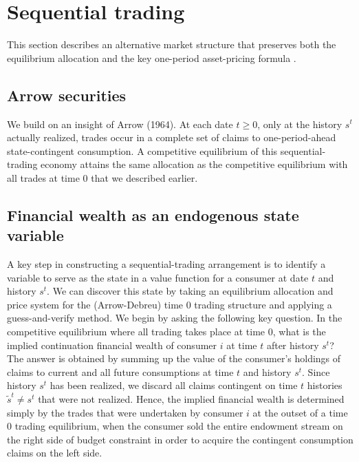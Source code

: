 
\section{Sequential trading}\label{sec:arrowsecurities}%
This section describes an alternative
market structure that preserves both the  equilibrium  allocation
 and the  key one-period asset-pricing formula
.



\subsection{Arrow securities}
We build on an insight of Arrow (1964).
At
each date  $t \geq 0$,  only at the history $s^t$ actually realized,  trades occur in a complete set of claims   to
one-period-ahead state-contingent consumption. A
competitive equilibrium of this sequential-trading economy
  attains the same allocation
as the competitive  equilibrium with all trades at time $0$ that we described earlier.



\subsection{Financial wealth as an endogenous state variable}
A key step in constructing a sequential-trading arrangement is to
identify a variable to serve as the state in a value function for
a consumer at date $t$ and history $s^t$. We can discover this state by taking an
equilibrium allocation and price system for the (Arrow-Debreu)
time $0$ trading structure and applying a guess-and-verify method.
We begin by asking the following key question. In the competitive
equilibrium where all trading takes place at time $0$, what is the implied continuation financial wealth of consumer $i$ at time $t$ after history $s^t$?
The answer is obtained by summing up the value of the consumer's
holdings of claims to current and all future consumptions at  time $t$ and
history $s^t$. Since history $s^t$ has been realized, we discard all
claims contingent on time $t$ histories $\tilde s^t \neq s^t$ that
were not realized. Hence, the implied financial wealth is  determined simply
by the trades that were undertaken by consumer $i$ at the outset of a
time $0$ trading equilibrium, when the consumer  sold  the entire endowment stream on the right side of budget
constraint  in order to acquire the contingent consumption claims
on the left side.

